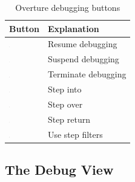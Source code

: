 \documentclass{overturerepchap}
\begin{document}
\begin{table}
\begin{center}
\caption{Overture debugging buttons\label{tab:debugButtons}}
\begin{tabular}{|l|l|}\hline \hline
\textbf{Button} & \textbf{Explanation} \\ \hline
\includegraphics[width=0.03\textwidth]{figures/resume} & Resume
debugging\index{icon!resume debugging} \\
\includegraphics[width=0.03\textwidth]{figures/suspend} & Suspend
debugging\index{icon!suspend debugging}\\
\includegraphics[width=0.03\textwidth]{figures/terminate} & Terminate
debugging\index{icon!terminate debugging}\\
\includegraphics[width=0.03\textwidth]{figures/stepinto} & Step
into\index{icon!step into}\\
\includegraphics[width=0.03\textwidth]{figures/stepover} & Step
over\index{icon!step over} \\
\includegraphics[width=0.03\textwidth]{figures/stepreturn} & Step
return\index{icon!step return}\\
\includegraphics[width=0.03\textwidth]{figures/stepbystep} & Use step
filters\index{icon!use step filters}\\
\hline \hline
\end{tabular}
\end{center}
\end{table}

\subsection{The Debug View}
\end{document}
